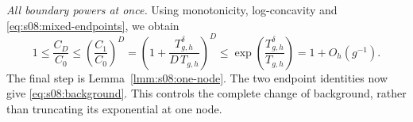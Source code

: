\begin{prf}
\smallskip\noindent
\emph{All boundary powers at once.}
Using monotonicity, log-concavity and
\eqref{eq:s08:mixed-endpoints}, we obtain
\begin{equation}\label{eq:s08:background-squeeze}
 1\leq\frac{C_D}{C_0}
 \leq\left(\frac{C_1}{C_0}\right)^D
 =\left(1+\frac{T_{g,h}^{\delta}}{D\,T_{g,h}}\right)^D
 \leq \exp\left(\frac{T_{g,h}^{\delta}}{T_{g,h}}\right)
 =1+O_h(g^{-1}).
\end{equation}
The final step is Lemma~\ref{lmm:s08:one-node}.
The two endpoint identities now give
\eqref{eq:s08:background}. This controls the complete change of
background, rather than truncating its exponential at one node.
\end{prf}
